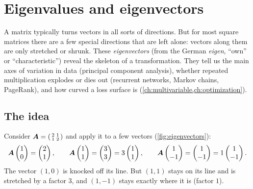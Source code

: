 \section{Eigenvalues and eigenvectors}\label{sec:eigen}

\begin{motivation}
A matrix typically turns vectors in all sorts of directions. But for most
square matrices there are a few special directions that are left alone:
vectors along them are only stretched or shrunk. These \emph{eigenvectors}
(from the German \emph{eigen}, ``own'' or ``characteristic'') reveal the
skeleton of a transformation. They tell us the main axes of variation in data
(principal component analysis), whether repeated multiplication explodes or
dies out (recurrent networks, Markov chains, PageRank), and how curved a loss
surface is (\cref{ch:multivariable,ch:optimization}).
\end{motivation}

\subsection{The idea}

Consider $\bm{A} = \left(\begin{smallmatrix} 2 & 1\\ 1 & 2\end{smallmatrix}\right)$
and apply it to a few vectors (\cref{fig:eigenvectors}):
\[
  \bm{A}\begin{pmatrix} 1\\ 0\end{pmatrix} = \begin{pmatrix} 2\\ 1\end{pmatrix},
  \qquad
  \bm{A}\begin{pmatrix} 1\\ 1\end{pmatrix} = \begin{pmatrix} 3\\ 3\end{pmatrix}
  = 3\begin{pmatrix} 1\\ 1\end{pmatrix},
  \qquad
  \bm{A}\begin{pmatrix} 1\\ -1\end{pmatrix} = \begin{pmatrix} 1\\ -1\end{pmatrix}
  = 1\begin{pmatrix} 1\\ -1\end{pmatrix}.
\]
The vector $(1, 0)$ is knocked off its line. But $(1, 1)$ stays on its line and
is stretched by a factor $3$, and $(1, -1)$ stays exactly where it is (factor
$1$).

